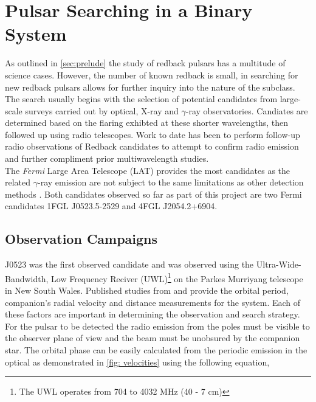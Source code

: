\newpage
\setcounter{page}{1} %
\section{Pulsar Searching in a Binary System} \label{sec:method-pulsar-searching}

As outlined in \cref{sec:prelude} the study of redback pulsars has a multitude of science cases. However, the number of known redback is small, in searching for new redback pulsars allows for further inquiry into the nature of the subclass. The search usually begins with the selection of potential candidates from large-scale surveys carried out by optical, X-ray and $\gamma$-ray observatories. Candiates are determined based on the flaring exhibted at these shorter wavelengths, then followed up using radio telescopes. Work to date has been to perform follow-up radio observations of Redback candidates to attempt to confirm radio emission and further compliment prior multiwavelength studies. \\ 

The \textit{Fermi} Large Area Telescope (LAT) provides the most candidates as the related $\gamma$-ray emission are not subject to the same limitations as other detection methods \citep{ray_radio_2012}. Both candidates observed so far as part of this project are two Fermi candidates 1FGL J0523.5-2529 and 4FGL J2054.2+6904. 

\subsection{Observation Campaigns}

J0523 was the first observed candidate and was observed using the Ultra-Wide-Bandwidth, Low Frequency Reciver (UWL)\footnote{The UWL operates from 704 to 4032 MHz (40 - 7 cm)} on the Parkes Murriyang telescope in New South Wales. Published studies from \cite{strader_1fgl_2014} and \cite{halpern_luminous_2022} provide the orbital period, companion's radial velocity and distance measurements for the system. Each of these factors are important in determining the observation and search strategy. \\ 

For the pulsar to be detected the radio emission from the poles must be visible to the observer plane of view and the beam must be unobsured by the companion star. The orbital phase can be easily calculated from the periodic emission in the optical as demonstrated in \cref{fig: velocities} using the following equation, 

